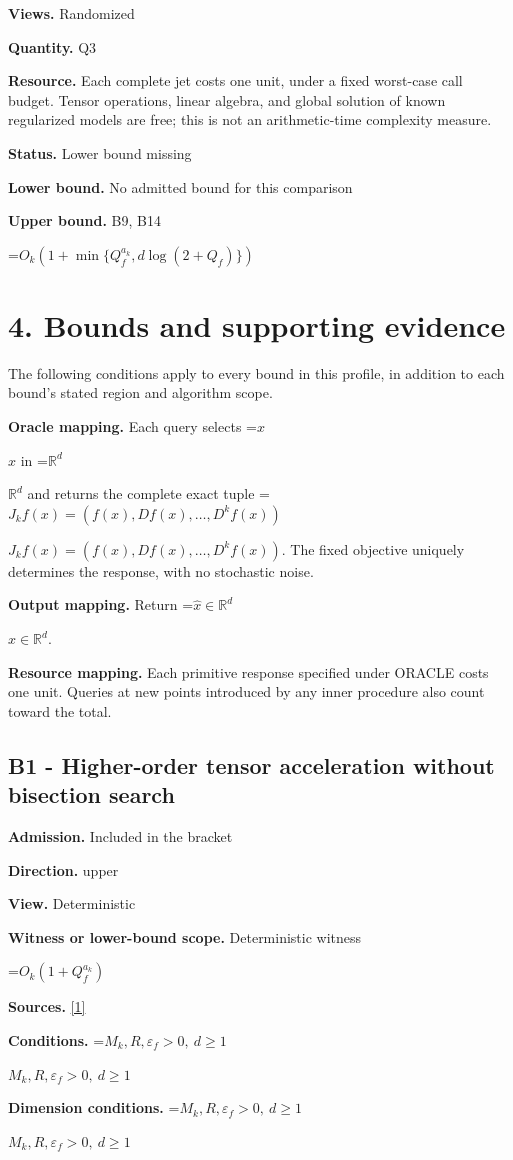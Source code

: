 \documentclass[10pt,a4paper]{article}
\newcommand{\AtlasMath}[1]{\par\begingroup\centering\setbox0=\hbox{$\displaystyle #1$}\ifdim\wd0>1.4\linewidth\typeout{ATLAS WIDE FORMULA: \the\wd0}\fi\ifdim\wd0>\linewidth\resizebox{\linewidth}{!}{\box0}\else\box0\fi\par\endgroup}
\newcommand{\AtlasInlineMath}[1]{\begingroup\setbox0=\hbox{$#1$}\ifdim\wd0>.4\linewidth\endgroup\AtlasMath{#1}\else\endgroup$#1$\fi}
\begin{document}
\textbf{Views.} Randomized

\textbf{Quantity.} Q3

\textbf{Resource.} Each complete jet costs one unit, under a fixed worst-case call budget. Tensor operations, linear algebra, and global solution of known regularized models are free; this is not an arithmetic-time complexity measure.

\textbf{Status.} Lower bound missing

\textbf{Lower bound.} No admitted bound for this comparison

\textbf{Upper bound.} B9, B14

\AtlasMath{O_k(1+\min\{Q_f^{a_k},d\log(2+Q_f)\})}
\section{4. Bounds and supporting evidence}
The following conditions apply to every bound in this profile, in addition to each bound's stated region and algorithm scope.

\textbf{Oracle mapping.} Each query selects \AtlasInlineMath{x} in \AtlasInlineMath{\mathbb{R}^d} and returns the complete exact tuple \AtlasInlineMath{J_{k}f(x)=(f(x),Df(x),\ldots,D^{k}f(x))}. The fixed objective uniquely determines the response, with no stochastic noise.

\textbf{Output mapping.} Return \AtlasInlineMath{\widehat{x}\in \mathbb{R}^d}.

\textbf{Resource mapping.} Each primitive response specified under ORACLE costs one unit. Queries at new points introduced by any inner procedure also count toward the total.

\subsection{B1 - Higher-order tensor acceleration without bisection search}
\textbf{Admission.} Included in the bracket

\textbf{Direction.} upper

\textbf{View.} Deterministic

\textbf{Witness or lower-bound scope.} Deterministic witness

\AtlasMath{O_k(1+Q_f^{a_k})}
\textbf{Sources.} \href{https://arxiv.org/pdf/2205.09647v1}{[1]}

\textbf{Conditions.} \AtlasInlineMath{M_k,R,\varepsilon_f>0,\ d\ge1}

\textbf{Dimension conditions.} \AtlasInlineMath{M_k,R,\varepsilon_f>0,\ d\ge1}
\end{document}
